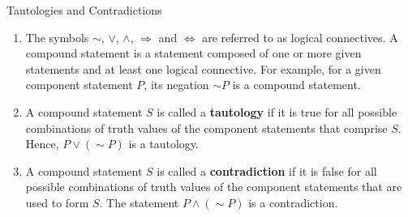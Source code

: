 \documentclass{beamer}
\begin{document}
\begin{frame}{Tautologies and Contradictions}
    \begin{enumerate}
        \item The symbols $\sim$, $\lor$, $\land$, $\Rightarrow$ and $\Leftrightarrow$ are referred to as logical connectives. A compound statement is a statement composed of one or more given statements and at least one logical connective. For example, for a given component statement $P$, its negation $\sim P$ is a compound statement.
        \item A compound statement $S$ is called a \textbf{tautology} if it is true for all possible combinations of truth values of the component statements that comprise $S$. Hence, $P \lor (\sim P)$ is a tautology.
        \item A compound statement $S$ is called a \textbf{contradiction} if it is false for all possible combinations of truth values of the component statements that are used to form $S$. The statement $P \land (\sim P)$ is a contradiction.
    \end{enumerate}

\end{frame}
\end{document}

